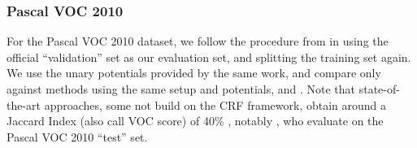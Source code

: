     


\subsubsection{Pascal VOC 2010}
For the Pascal VOC 2010 dataset, we follow the procedure from \citet{krahenbuhl2012efficient}
in using the official ``validation'' set as our evaluation set, and splitting the training set again.
We use the unary potentials provided by the same work, and compare only against methods
using the same setup and potentials, \citet{krahenbuhlparameter} and \citet{dann2012pottics}.
Note that state-of-the-art approaches, some not build on the CRF framework, obtain
around a Jaccard Index (also call VOC score) of 40\% , notably \cite{xia2012segmentation}, who 
evaluate on the Pascal VOC 2010 ``test'' set.


